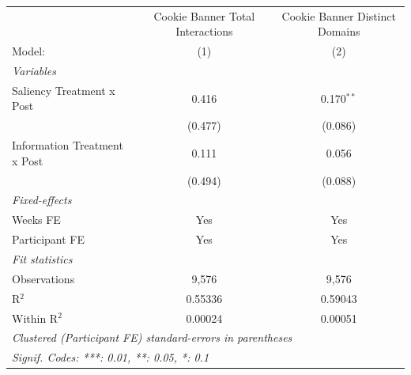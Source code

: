 \begin{tabular}{lcc}
   \tabularnewline \midrule \midrule
                                & Cookie Banner Total Interactions & Cookie Banner Distinct Domains \\   
   Model:                       & (1)                              & (2)\\  
   \midrule
   \emph{Variables}\\
   Saliency Treatment x Post    & 0.416                            & 0.170$^{**}$\\   
                                & (0.477)                          & (0.086)\\   
   Information Treatment x Post & 0.111                            & 0.056\\   
                                & (0.494)                          & (0.088)\\   
   \midrule
   \emph{Fixed-effects}\\
   Weeks FE                     & Yes                              & Yes\\  
   Participant FE               & Yes                              & Yes\\  
   \midrule
   \emph{Fit statistics}\\
   Observations                 & 9,576                            & 9,576\\  
   R$^2$                        & 0.55336                          & 0.59043\\  
   Within R$^2$                 & 0.00024                          & 0.00051\\  
   \midrule \midrule
   \multicolumn{3}{l}{\emph{Clustered (Participant FE) standard-errors in parentheses}}\\
   \multicolumn{3}{l}{\emph{Signif. Codes: ***: 0.01, **: 0.05, *: 0.1}}\\
\end{tabular}
